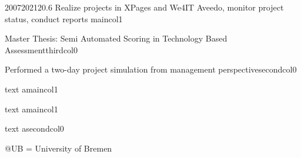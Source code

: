\documentclass[10pt,A4]{article}
\begin{document}
\begin{minipage}{0.4\textwidth}
\begin{center}
\begin{cvtimeline}{2007}{2021}{20.6}{\linewidth}
    {Realize projects in XPages and We4IT Aveedo, monitor project status, conduct reports}
    {maincol}{1}

    {Master Thesis: Semi Automated Scoring in Technology Based Assessment}{thirdcol}{0}

    {Performed a two-day project simulation from management perspective}{secondcol}{0}

    {text a}{maincol}{1}
    
    {text a}{maincol}{1}    
    
    {text a}{secondcol}{0}
     
\end{cvtimeline}
\tiny @UB = University of Bremen
\end{center}
\end{minipage}
%
%
%
%
%
%
\end{document}
